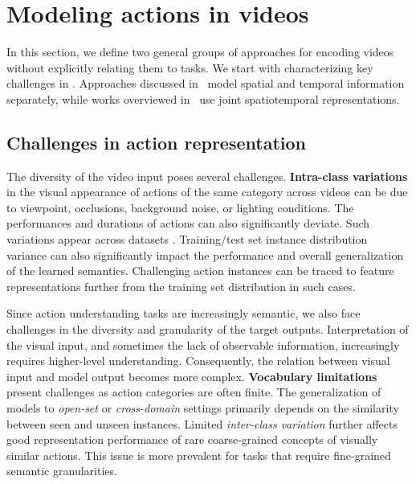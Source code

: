 \section{Modeling actions in videos}
\label{sec:modeling}

In this section, we define two general groups of approaches for encoding videos without explicitly relating them to tasks. We start with characterizing key challenges in . Approaches discussed in~ model spatial and temporal information separately, while works overviewed in~ use joint spatiotemporal representations. 

\subsection{Challenges in action representation}
\label{sec:modeling::challenges}

The diversity of the video input poses several challenges. \textbf{Intra-class variations} in the visual appearance of actions of the same category across videos can be due to viewpoint, occlusions, background noise, or lighting conditions. The performances and durations of actions can also significantly deviate. Such variations appear across datasets  . Training/test set instance distribution variance can also significantly impact the performance and overall generalization of the learned semantics. Challenging action instances can be traced to feature representations further from the training set distribution in such cases.

Since action understanding tasks are increasingly semantic, we also face challenges in the diversity and granularity of the target outputs. Interpretation of the visual input, and sometimes the lack of observable information, increasingly requires higher-level understanding. Consequently, the relation between visual input and model output becomes more complex. \textbf{Vocabulary limitations} present challenges as action categories are often finite. The generalization of models to \emph{open-set} or \emph{cross-domain} settings primarily depends on the similarity between seen and unseen instances. Limited \textit{inter-class variation} further affects good representation performance of rare coarse-grained concepts of visually similar actions. This issue is more prevalent for tasks that require fine-grained semantic granularities.


